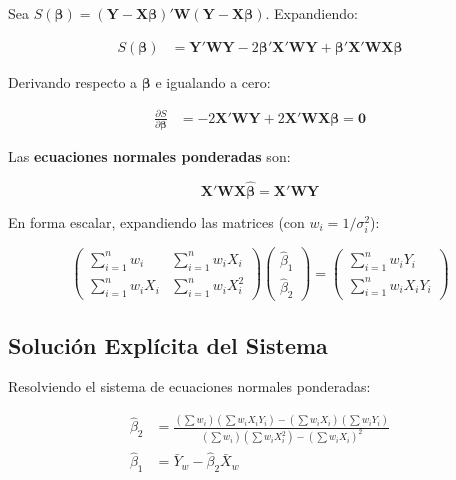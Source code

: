 \documentclass[12pt,a4paper]{article}
\begin{document}
Sea $S(\boldsymbol{\beta}) = (\mathbf{Y}-\mathbf{X}\boldsymbol{\beta})'\mathbf{W}(\mathbf{Y}-\mathbf{X}\boldsymbol{\beta})$. Expandiendo:

\begin{align}
S(\boldsymbol{\beta}) &= \mathbf{Y}'\mathbf{W}\mathbf{Y} - 2\boldsymbol{\beta}'\mathbf{X}'\mathbf{W}\mathbf{Y} + \boldsymbol{\beta}'\mathbf{X}'\mathbf{W}\mathbf{X}\boldsymbol{\beta}
\end{align}

Derivando respecto a $\boldsymbol{\beta}$ e igualando a cero:

\begin{align}
\frac{\partial S}{\partial \boldsymbol{\beta}} &= -2\mathbf{X}'\mathbf{W}\mathbf{Y} + 2\mathbf{X}'\mathbf{W}\mathbf{X}\boldsymbol{\beta} = \mathbf{0}
\end{align}

Las \textbf{ecuaciones normales ponderadas} son:

\begin{equation}
\boxed{\mathbf{X}'\mathbf{W}\mathbf{X}\hat{\boldsymbol{\beta}} = \mathbf{X}'\mathbf{W}\mathbf{Y}}
\label{eq:normales}
\end{equation}

En forma escalar, expandiendo las matrices (con $w_i = 1/\sigma_i^2$):

\begin{equation}
\begin{pmatrix}
\displaystyle\sum_{i=1}^n w_i & \displaystyle\sum_{i=1}^n w_i X_i \\[12pt]
\displaystyle\sum_{i=1}^n w_i X_i & \displaystyle\sum_{i=1}^n w_i X_i^2
\end{pmatrix}
\begin{pmatrix} \hat{\beta}_1 \\ \hat{\beta}_2 \end{pmatrix}
=
\begin{pmatrix}
\displaystyle\sum_{i=1}^n w_i Y_i \\[12pt]
\displaystyle\sum_{i=1}^n w_i X_i Y_i
\end{pmatrix}
\end{equation}

\subsection{Solución Explícita del Sistema}

Resolviendo el sistema de ecuaciones normales ponderadas:

\begin{align}
\hat{\beta}_2 &= \frac{\displaystyle\left(\sum w_i\right)\left(\sum w_i X_i Y_i\right) - \left(\sum w_i X_i\right)\left(\sum w_i Y_i\right)}{\displaystyle\left(\sum w_i\right)\left(\sum w_i X_i^2\right) - \left(\sum w_i X_i\right)^2} \label{eq:beta2_mcp}\\[10pt]
\hat{\beta}_1 &= \bar{Y}_w - \hat{\beta}_2 \bar{X}_w \label{eq:beta1_mcp}
\end{align}
\end{document}
